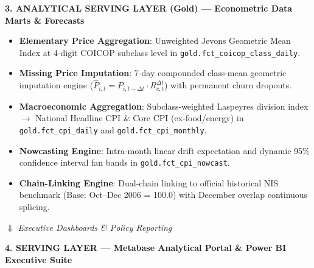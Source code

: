 \documentclass[11pt,a4paper]{article}
\begin{document}
\begin{center}
\begin{tcolorbox}[colback=white,colframe=NavyBlue,width=\textwidth,title=\bfseries Comprehensive Data Platform Architecture]
\raggedright
\textbf{3. ANALYTICAL SERVING LAYER (Gold) --- Econometric Data Marts \& Forecasts}
\begin{itemize}[noitemsep]
    \item \textbf{Elementary Price Aggregation}: Unweighted Jevons Geometric Mean Index at 4-digit COICOP subclass level in \texttt{gold.fct\_coicop\_class\_daily}.
    \item \textbf{Missing Price Imputation}: 7-day compounded class-mean geometric imputation engine ($\widehat{P}_{i,t} = P_{i,t-\Delta t} \cdot R_{c,t}^{\Delta t}$) with permanent churn dropouts.
    \item \textbf{Macroeconomic Aggregation}: Subclass-weighted Laspeyres division index $\rightarrow$ National Headline CPI \& Core CPI (ex-food/energy) in \texttt{gold.fct\_cpi\_daily} and \texttt{gold.fct\_cpi\_monthly}.
    \item \textbf{Nowcasting Engine}: Intra-month linear drift expectation and dynamic 95\% confidence interval fan bands in \texttt{gold.fct\_cpi\_nowcast}.
    \item \textbf{Chain-Linking Engine}: Dual-chain linking to official historical NIS benchmark (Base: Oct--Dec 2006 = 100.0) with December overlap continuous splicing.
\end{itemize}
\centering $\Downarrow$ \textit{Executive Dashboards \& Policy Reporting} \\
\raggedright
\textbf{4. SERVING LAYER --- Metabase Analytical Portal \& Power BI Executive Suite}
\end{tcolorbox}
\end{center}
\end{document}
